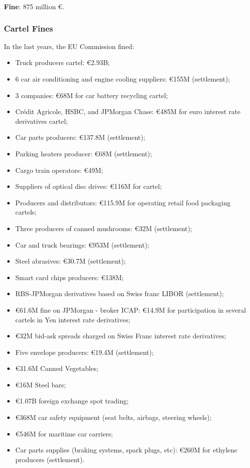         \textbf{Fine}: 875 million €.

        \subsubsection{Cartel Fines}

            In the last years, the EU Commission fined:
            \begin{itemize}
                \item Truck producers cartel: €2.93B;
                \item 6 car air conditioning and engine cooling suppliers: €155M (settlement);
                \item 3 companies: €68M for car battery recycling cartel;
                \item Crédit Agricole, HSBC, and JPMorgan Chase: €485M for euro interest rate derivatives cartel;
                \item Car parts producers: €137.8M (settlement);
                \item Parking heaters producer: €68M (settlement);
                \item Cargo train operators: €49M;
                \item Suppliers of optical disc drives: €116M for cartel;
                \item Producers and distributors: €115.9M for operating retail food packaging cartels;
                \item Three producers of canned mushrooms: €32M (settlement);
                \item Car and truck bearings: €953M (settlement);
                \item Steel abrasives: €30.7M (settlement);
                \item Smart card chips producers: €138M;
                \item RBS-JPMorgan derivatives based on Swiss franc LIBOR (settlement);
                \item €61.6M fine on JPMorgan - broker ICAP: €14.9M for participation in several cartels in Yen interest rate derivatives;
                \item €32M bid-ask spreads charged on Swiss Franc interest rate derivatives;
                \item Five envelope producers: €19.4M (settlement);
                \item €31.6M Canned Vegetables;
                \item €16M Steel bars;
                \item €1.07B foreign exchange spot trading;
                \item €368M car safety equipment (seat belts, airbags, steering wheels);
                \item €546M for maritime car carriers;
                \item Car parts supplies (braking systems, spark plugs, etc): €260M for ethylene producers (settlement).
            \end{itemize}

